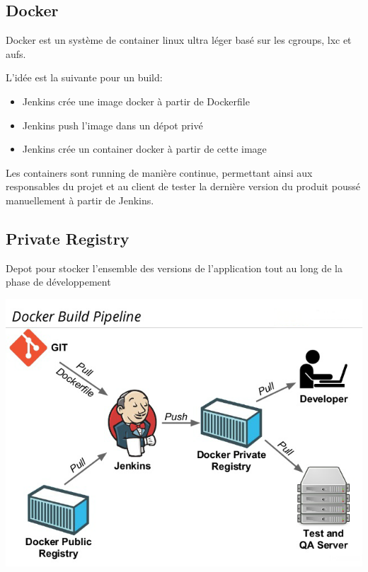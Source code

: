 \documentclass [a4paper,11pt]{article}
\begin{document}
\subsection{Docker}

Docker est un système de container linux ultra léger basé sur les cgroups, lxc et aufs.\newline

L'idée est la suivante pour un build:\newline

\begin{itemize}
 \item Jenkins crée une image docker à partir de Dockerfile
 \item Jenkins push l'image dans un dépot privé
 \item Jenkins crée un container docker à partir de cette image\newline
\end{itemize}
\newline
Les containers sont running de manière continue, permettant ainsi aux responsables du projet et au client de tester la dernière version du produit poussé manuellement à partir de Jenkins.

\subsection{Private Registry}

Depot pour stocker l'ensemble des versions de l'application tout au long de la phase de développement

\begin{center}
\includegraphics[scale=0.4]{img/registry.png}
\end{center}
\end{document}
